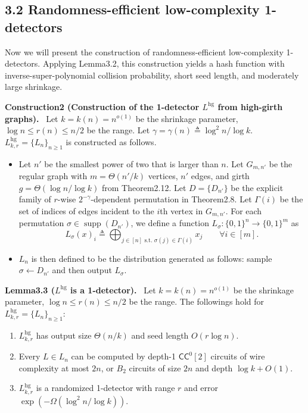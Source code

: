 \documentclass[10pt,a4paper]{article}
\newenvironment{authorclaim}[1]{\par\medskip\noindent\textbf{#1.}\ }{\par\medskip}
\begin{document}
\subsection*{3.2 Randomness-efficient low-complexity 1-detectors}
Now we will present the construction of randomness-efficient low-complexity 1-detectors. Applying Lemma3.2, this construction yields a hash function with inverse-super-polynomial collision probability, short seed length, and moderately large shrinkage.
\begin{authorclaim}{Construction2 (Construction of the 1-detector $L^{\mathrm{hg}}$ from high-girth graphs)}
Let $k=k(n)=n^{o(1)}$ be the shrinkage parameter, $\log n\le r(n)\le n/2$ be the range. Let $\gamma=\gamma(n)\triangleq\log^2n/\log k$. $L^{\mathrm{hg}}_{k,r}=\{L_n\}_{n\ge1}$ is constructed as follows.
\begin{itemize}
\item Let $n'$ be the smallest power of two that is larger than $n$. Let $G_{m,n'}$ be the regular graph with $m=\Theta(n'/k)$ vertices, $n'$ edges, and girth $g=\Theta(\log n/\log k)$ from Theorem2.12. Let $D=\{D_{n'}\}$ be the explicit family of $r$-wise $2^{-\gamma}$-dependent permutation in Theorem2.8. Let $\Gamma(i)$ be the set of indices of edges incident to the $i$th vertex in $G_{m,n'}$. For each permutation $\sigma\in\operatorname{supp}(D_{n'})$, we define a function $L_\sigma:\{0,1\}^n\to\{0,1\}^m$ as
\[L_\sigma(x)_i\triangleq\bigoplus_{j\in[n]\text{ s.t. }\sigma(j)\in\Gamma(i)}x_j\qquad\forall i\in[m].\]
\item $L_n$ is then defined to be the distribution generated as follows: sample $\sigma\leftarrow D_{n'}$ and then output $L_\sigma$.
\end{itemize}
\end{authorclaim}
\begin{authorclaim}{Lemma3.3 ($L^{\mathrm{hg}}$ is a 1-detector)}
Let $k=k(n)=n^{o(1)}$ be the shrinkage parameter, $\log n\le r(n)\le n/2$ be the range. The followings hold for $L^{\mathrm{hg}}_{k,r}=\{L_n\}_{n\ge1}$:
\begin{enumerate}
\item $L^{\mathrm{hg}}_{k,r}$ has output size $\Theta(n/k)$ and seed length $O(r\log n)$.
\item Every $L\in L_n$ can be computed by depth-1 $\mathsf{CC}^0[2]$ circuits of wire complexity at most $2n$, or $B_2$ circuits of size $2n$ and depth $\log k+O(1)$.
\item $L^{\mathrm{hg}}_{k,r}$ is a randomized 1-detector with range $r$ and error $\exp(-\Omega(\log^2n/\log k))$.
\end{enumerate}
\end{authorclaim}
\end{document}
